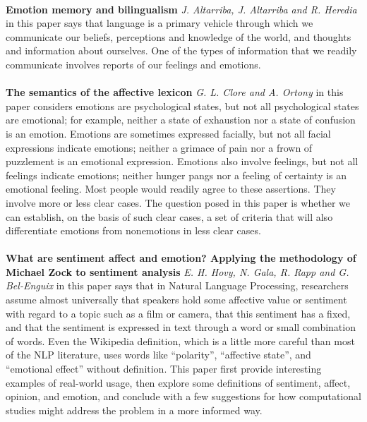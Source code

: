 \documentclass[a4paper,12pt,oneside]{article}
\begin{document}
\paragraph{}
\textbf{Emotion memory and bilingualism} 
\textit{J. Altarriba, J. Altarriba and R. Heredia} in this paper says that
language is a primary vehicle through which we communicate our beliefs, perceptions and knowledge of the world, and thoughts and information about ourselves. One of the types of information that we readily communicate involves reports of our feelings and emotions.
\paragraph{}
\textbf{The semantics of the affective lexicon} 
\textit{G. L. Clore and A. Ortony} in this paper considers
emotions are psychological states, but not all psychological states are emotional; for example, neither a state of exhaustion nor a state of confusion is an emotion. Emotions are sometimes expressed facially, but not all facial expressions indicate emotions; neither a grimace of pain nor a frown of puzzlement is an emotional expression. Emotions also involve feelings, but not all feelings indicate emotions; neither hunger pangs nor a feeling of certainty is an emotional feeling. Most people would readily agree to these assertions. They involve more or less clear cases. The question posed in this paper is whether we can establish, on the basis of such clear cases, a set of criteria that will also differentiate emotions from nonemotions in less clear cases.
\paragraph{}
\textbf{What are sentiment affect and emotion? Applying the methodology of Michael Zock to sentiment analysis} 
\textit{E. H. Hovy, N. Gala, R. Rapp and G. Bel-Enguix} in this paper says that
in Natural Language Processing, researchers assume almost universally that speakers hold some affective value or sentiment with regard to a topic such as a film or camera, that this sentiment has a fixed, and that the sentiment is expressed in text through a word or small combination of words. Even the Wikipedia definition, which is a little more careful than most of the NLP literature, uses words like “polarity”, “affective state”, and “emotional effect” without definition. This paper first provide interesting examples of real-world usage, then explore some definitions of sentiment, affect, opinion, and emotion, and conclude with a few suggestions for how computational studies might address the problem in a more informed way.
\end{document}
